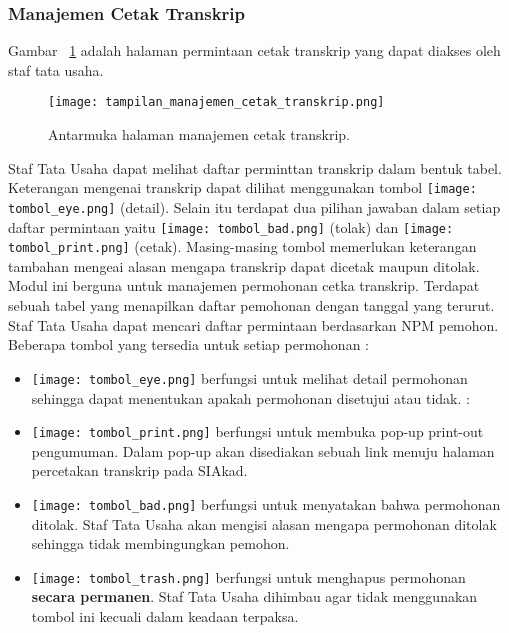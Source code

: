 \subsubsection{Manajemen Cetak Transkrip}
\noindent Gambar ~\ref{fig:tampilanManajemenCetakTranskrip} adalah halaman permintaan cetak transkrip yang dapat diakses oleh staf tata usaha.
\begin{figure} [H]
	\centering  
	\texttt{[image: tampilan\_manajemen\_cetak\_transkrip.png]} 
	\caption{Antarmuka halaman manajemen cetak transkrip.} 
	\label{fig:tampilanManajemenCetakTranskrip}
\end{figure}
Staf Tata Usaha dapat melihat daftar perminttan transkrip dalam bentuk tabel. Keterangan mengenai transkrip dapat dilihat menggunakan tombol \texttt{[image: tombol\_eye.png]} (detail). Selain itu terdapat dua pilihan jawaban dalam setiap daftar permintaan yaitu \texttt{[image: tombol\_bad.png]} (tolak) dan 
\texttt{[image: tombol\_print.png]} (cetak). Masing-masing tombol memerlukan keterangan tambahan mengeai alasan mengapa transkrip dapat dicetak maupun ditolak.\noindent
Modul ini berguna untuk manajemen permohonan cetka transkrip. Terdapat sebuah tabel yang menapilkan daftar pemohonan dengan tanggal yang terurut. Staf Tata Usaha dapat mencari daftar permintaan berdasarkan NPM pemohon.
Beberapa tombol yang tersedia untuk setiap permohonan :

\begin{itemize}
	\item \texttt{[image: tombol\_eye.png]} berfungsi untuk melihat detail permohonan sehingga dapat menentukan apakah permohonan disetujui atau tidak.
	: \item \texttt{[image: tombol\_print.png]} berfungsi untuk membuka pop-up print-out pengumuman. Dalam pop-up akan disediakan sebuah link menuju halaman percetakan transkrip pada SIAkad.
	\item \texttt{[image: tombol\_bad.png]} berfungsi untuk menyatakan bahwa permohonan ditolak. Staf Tata Usaha akan mengisi alasan mengapa permohonan ditolak sehingga tidak membingungkan pemohon.
	\item \texttt{[image: tombol\_trash.png]} berfungsi untuk menghapus permohonan \textbf{secara permanen}. Staf Tata Usaha dihimbau agar tidak menggunakan tombol ini kecuali dalam keadaan terpaksa.
\end{itemize}  

